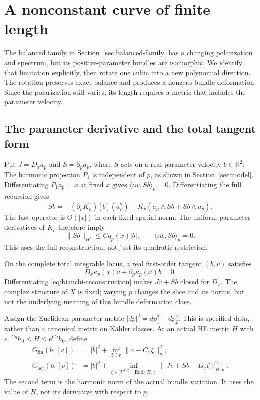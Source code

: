 \documentclass[11pt]{amsart}
\theoremstyle{definition}
\theoremstyle{remark}
\newcommand{\RR}{\mathbb R}
\newcommand{\End}{\operatorname{End}}
\begin{document}
\section{A nonconstant curve of finite length}\label{sec:moving-curve}

The balanced family in Section~\ref{sec:balanced-family} has a changing
polarization and spectrum, but its positive-parameter bundles are
isomorphic. We identify that limitation explicitly, then rotate one cubic
into a new polynomial direction. The rotation preserves exact balance
and produces a nonzero bundle deformation. Since the polarization still
varies, its length requires a metric that includes the parameter velocity.

\subsection{The parameter derivative and the total tangent form}
Put $J=D_xa_p$ and $S=\partial_pa_p$, where $S$ acts on a real
parameter velocity $b\in\RR^2$. The harmonic projection $P_1$ is
independent of $p$, as shown in Section~\ref{sec:model}.
Differentiating $P_1a_p=x$ at fixed $x$ gives
$\langle\iota w,Sb\rangle_p=0$. Differentiating the full recursion
gives
\[
 Sb=-(\partial_pK_p)[b](a_p^2)
       -K_p(a_p\wedge Sb+Sb\wedge a_p).
\]
The last operator is $O(|x|)$ in each fixed spatial norm. The uniform
parameter derivatives of $K_p$ therefore imply
\begin{equation}\label{eq:parameter-derivative}
 \|Sb\|_{H^s}\le Cq_p(x)|b|,\qquad
 \langle\iota w,Sb\rangle_p=0.
\end{equation}
This uses the full reconstruction, not just its quadratic restriction.

On the complete total integrable locus, a real first-order tangent
$(b,v)$ satisfies
\begin{equation}\label{eq:total-integrability}
 D_x\kappa_p(x)v+\partial_p\kappa_p(x)b=0.
\end{equation}
Differentiating \eqref{eq:bianchi-reconstruction} makes $Jv+Sb$
closed for $D_x$. The complex structure of $X$ is fixed; varying
$p$ changes the slice and its norms, but not the underlying meaning
of this bundle deformation class.

Assign the Euclidean parameter metric $|dp|^2=dp_1^2+dp_2^2$.
This is specified data, rather than a canonical metric on K\"ahler
classes. At an actual HE metric $H$ with
$e^{-Cq}h_0\le H\le e^{Cq}h_0$, define
\begin{align}
 G_{\mathrm{fin}}(b,[v])&=|b|^2+
                 \inf_{\xi\in\mathfrak g}\|v-C_x\xi\|_p^2,
                 \label{eq:total-finite}\\
 G_{\mathrm{act}}(b,[v])&=|b|^2+
       \inf_{\zeta\in W^{1,2}(\End_0E_0)}
           \|Jv+Sb-D_x\zeta\|_{H,p}^2.\label{eq:total-actual}
\end{align}
The second term is the harmonic norm of the actual bundle variation.
It uses the value of $H$, not its derivative with respect to $p$.
\end{document}
